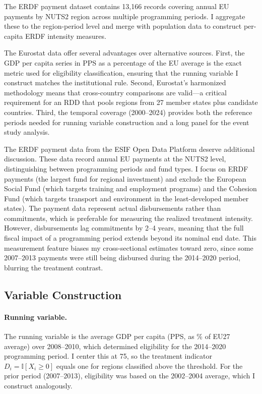 \documentclass[12pt]{article}
\newcommand{\ind}{\mathbb{I}}
\begin{document}
The ERDF payment dataset contains 13,166 records covering annual EU payments by NUTS2 region across multiple programming periods. I aggregate these to the region-period level and merge with population data to construct per-capita ERDF intensity measures.

The Eurostat data offer several advantages over alternative sources. First, the GDP per capita series in PPS as a percentage of the EU average is the exact metric used for eligibility classification, ensuring that the running variable I construct matches the institutional rule. Second, Eurostat's harmonized methodology means that cross-country comparisons are valid---a critical requirement for an RDD that pools regions from 27 member states plus candidate countries. Third, the temporal coverage (2000--2024) provides both the reference periods needed for running variable construction and a long panel for the event study analysis.

The ERDF payment data from the ESIF Open Data Platform deserve additional discussion. These data record annual EU payments at the NUTS2 level, distinguishing between programming periods and fund types. I focus on ERDF payments (the largest fund for regional investment) and exclude the European Social Fund (which targets training and employment programs) and the Cohesion Fund (which targets transport and environment in the least-developed member states). The payment data represent actual disbursements rather than commitments, which is preferable for measuring the realized treatment intensity. However, disbursements lag commitments by 2--4 years, meaning that the full fiscal impact of a programming period extends beyond its nominal end date. This measurement feature biases my cross-sectional estimates toward zero, since some 2007--2013 payments were still being disbursed during the 2014--2020 period, blurring the treatment contrast.

\subsection{Variable Construction}

\paragraph{Running variable.} The running variable is the average GDP per capita (PPS, as \% of EU27 average) over 2008--2010, which determined eligibility for the 2014--2020 programming period. I center this at 75, so the treatment indicator $D_i = \ind[X_i \geq 0]$ equals one for regions classified above the threshold. For the prior period (2007--2013), eligibility was based on the 2002--2004 average, which I construct analogously.
\end{document}
